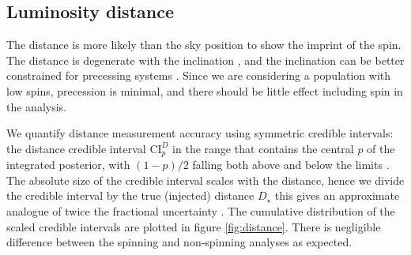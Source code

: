 \subsection{Luminosity distance}\label{sec:distance}

The distance is more likely than the sky position to show the imprint of the spin. The distance is degenerate with the inclination \citep{Cutler_1994,Aasi_2013}, and the inclination can be better constrained for precessing systems \citep{van_der_Sluys_2008,Vitale_2014}. Since we are considering a population with low spins, precession is minimal, and there should be little effect including spin in the analysis.

We quantify distance measurement accuracy using symmetric credible intervals: the distance credible interval $\mathrm{CI}_p^{D}$ in the range that contains the central $p$ of the integrated posterior, with $(1-p)/2$ falling both above and below the limits \citep{Aasi_2013}. The absolute size of the credible interval scales with the distance, hence we divide the credible interval by the true (injected) distance $D_\star$ this gives an approximate analogue of twice the fractional uncertainty \citep{Berry_2014}. The cumulative distribution of the scaled credible intervals are plotted in figure \ref{fig:distance}. There is negligible difference between the spinning and non-spinning analyses as expected.

